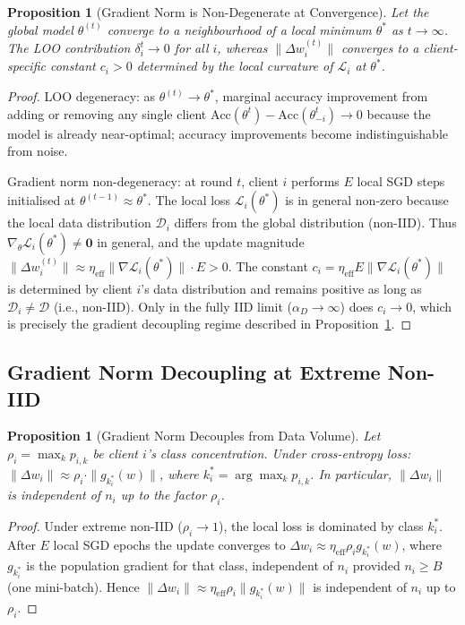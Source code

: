 \documentclass[journal]{IEEEtran}
\newtheorem{proposition}[theorem]{Proposition}
\theoremstyle{definition}
\theoremstyle{remark}
\begin{document}
\begin{proposition}[Gradient Norm is Non-Degenerate at Convergence]
\label{prop:nondegen}
Let the global model $\theta^{(t)}$ converge to a neighbourhood of
a local minimum $\theta^*$ as $t \to \infty$.
The LOO contribution $\delta_i^t \to 0$ for all $i$, whereas
$\|\Delta w_i^{(t)}\|$ converges to a client-specific constant
$c_i > 0$ determined by the local curvature of $\mathcal{L}_i$
at $\theta^*$.
\end{proposition}
\begin{proof}
LOO degeneracy: as $\theta^{(t)} \to \theta^*$, marginal accuracy
improvement from adding or removing any single client
$\mathrm{Acc}(\theta^t) - \mathrm{Acc}(\theta^t_{-i}) \to 0$
because the model is already near-optimal; accuracy improvements
become indistinguishable from noise.

Gradient norm non-degeneracy: at round $t$, client $i$ performs $E$
local SGD steps initialised at $\theta^{(t-1)} \approx \theta^*$.
The local loss $\mathcal{L}_i(\theta^*)$ is in general non-zero
because the local data distribution $\mathcal{D}_i$ differs from the
global distribution (non-IID).
Thus $\nabla_\theta \mathcal{L}_i(\theta^*) \neq \mathbf{0}$ in
general, and the update magnitude
$\|\Delta w_i^{(t)}\| \approx \eta_{\mathrm{eff}}
\|\nabla \mathcal{L}_i(\theta^*)\| \cdot E > 0$.
The constant $c_i = \eta_{\mathrm{eff}} E \|\nabla \mathcal{L}_i(\theta^*)\|$
is determined by client $i$'s data distribution and remains positive
as long as $\mathcal{D}_i \neq \mathcal{D}$ (i.e., non-IID).
Only in the fully IID limit ($\alpha_D \to \infty$) does $c_i \to 0$,
which is precisely the gradient decoupling regime described in
Proposition~\ref{prop:gradnorm_limit}.
\end{proof}

\subsection{Gradient Norm Decoupling at Extreme Non-IID}
\label{subsec:decoupling}

\begin{proposition}[Gradient Norm Decouples from Data Volume]
\label{prop:gradnorm_limit}
Let $\rho_i = \max_k p_{i,k}$ be client $i$'s class concentration.
Under cross-entropy loss:
$\|\Delta w_i\| \approx \rho_i \cdot \|g_{k_i^*}(w)\|$,
where $k_i^* = \arg\max_k p_{i,k}$.
In particular, $\|\Delta w_i\|$ is independent of $n_i$ up to the
factor $\rho_i$.
\end{proposition}
\begin{proof}
Under extreme non-IID ($\rho_i \to 1$), the local loss is dominated
by class $k_i^*$. After $E$ local SGD epochs the update converges to
$\Delta w_i \approx \eta_{\mathrm{eff}}\rho_i g_{k_i^*}(w)$, where
$g_{k_i^*}$ is the population gradient for that class, independent
of $n_i$ provided $n_i \geq B$ (one mini-batch).
Hence $\|\Delta w_i\| \approx \eta_{\mathrm{eff}}\rho_i\|g_{k_i^*}(w)\|$
is independent of $n_i$ up to $\rho_i$.
\end{proof}
\end{document}
